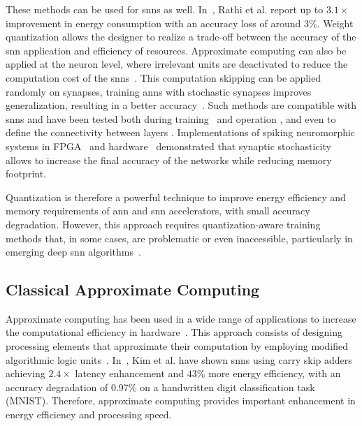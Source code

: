 These methods can be used for \glspl{snn} as well. In~\cite{rathi2018stdp}, Rathi et al. report up to $3.1\times$ improvement in energy consumption with an accuracy loss of around $3\%$. Weight quantization allows the designer to realize a trade-off between the accuracy of the \gls{snn} application and efficiency of resources. Approximate computing can also be applied at the neuron level, where irrelevant units are deactivated to reduce the computation cost of the \glspl{snn}~\cite{sen2017approximate}. This computation skipping can be applied randomly on synapses, training \glspl{ann} with stochastic synapses improves generalization, resulting in a better accuracy~\cite{srivastava2014dropout, wan2013regularization}. Such methods are compatible with \glspl{snn} and have been tested both during training~\cite{neftci2016stochastic, srinivasan2016magnetic} and operation \cite{buesing2011neural}, and even to define the connectivity between layers \cite{bellec2017deep, chen20184096}. Implementations of spiking neuromorphic systems in FPGA~\cite{sheik2016synaptic} and hardware~\cite{jerry2017ultra} demonstrated that synaptic stochasticity allows to increase the final accuracy of the networks while reducing memory footprint.

Quantization is therefore a powerful technique to improve energy efficiency and memory requirements of \gls{ann} and \gls{snn} accelerators, with small accuracy degradation. However, this approach requires quantization-aware training methods that, in some cases, are problematic or even inaccessible, particularly in emerging deep \gls{snn} algorithms~\cite{zhang2018survey}.

\subsection{Classical Approximate Computing}
Approximate computing has been used in a wide range of applications to increase the computational efficiency in hardware~\cite{han2013approximate}. This approach consists of designing processing elements that approximate their computation by employing modified algorithmic logic units~\cite{han2013approximate}. In~\cite{kim2013energy}, Kim et al. have shown \glspl{snn} using carry skip adders achieving $2.4\times$ latency enhancement and $43\%$ more energy efficiency, with an accuracy degradation of 0.97\% on a handwritten digit classification task (MNIST). Therefore, approximate computing provides important enhancement in energy efficiency and processing speed.


